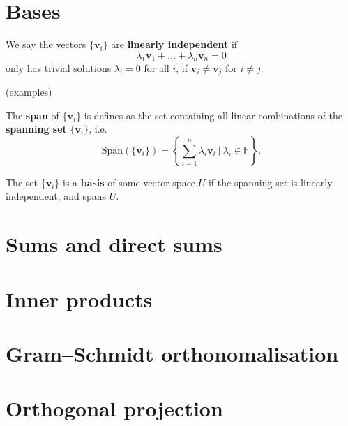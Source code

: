 \documentclass[letter-paper]{tufte-book}
\newcommand{\vb}{{\boldsymbol{v}}}
\begin{document}

\section{Bases}

We say the vectors $\{\vb_i\}$ are \textbf{linearly independent} if
\begin{equation}
  \lambda_1 \vb_1 + \ldots + \lambda_n \vb_n = 0
\end{equation}
only has trivial solutions $\lambda_i = 0$ for all $i$, if $\vb_i \neq \vb_j$
for $i\neq j$.

(examples)

The \textbf{span} of $\{\vb_i\}$ is defines as the set containing all linear
combinations of the \textbf{spanning set} $\{\vb_i\}$, i.e.
\begin{equation}
  \mbox{Span}(\{\vb_i\}) = \left\{ \sum_{i=1}^n \lambda_i \vb_i \ |\ \lambda_i \in \mathbb{F} \right\}.
\end{equation}

The set $\{\vb_i\}$ is a \textbf{basis} of some vector space $U$ if the spanning
set is linearly independent, and spans $U$.


\section{Sums and direct sums}


\section{Inner products}


\section{Gram--Schmidt orthonomalisation}


\section{Orthogonal projection}
\end{document}
